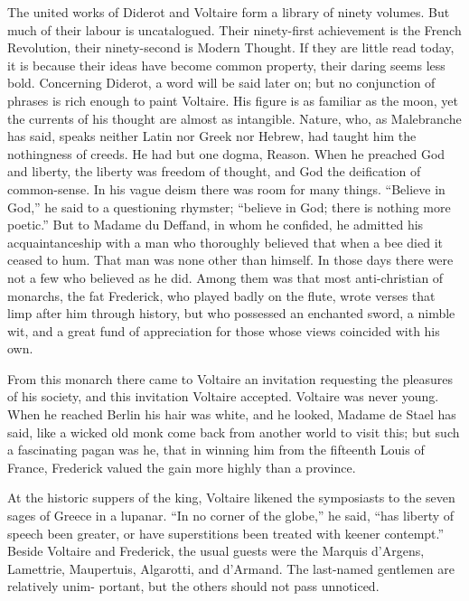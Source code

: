 \documentclass[]{book}
\begin{document}
The united works of Diderot and Voltaire form a library of ninety
volumes. But much of their labour is uncatalogued. Their ninety-first
achievement is the French Revolution, their ninety-second is Modern
Thought. If they are little read today, it is because their ideas have
become common property, their daring seems less bold. Concerning
Diderot, a word will be said later on; but no conjunction of phrases is
rich enough to paint Voltaire. His figure is as familiar as the moon,
yet the currents of his thought are almost as intangible. Nature, who,
as Malebranche has said, speaks neither Latin nor Greek nor Hebrew, had
taught him the nothingness of creeds. He had but one dogma, Reason. When
he preached God and liberty, the liberty was freedom of thought, and God
the deification of common-sense. In his vague deism there was room for
many things. ``Believe in God,'' he said to a questioning rhymster;
``believe in God; there is nothing more poetic.'' But to Madame du
Deffand, in whom he confided, he admitted his acquaintanceship with a
man who thoroughly believed that when a bee died it ceased to hum. That
man was none other than himself. In those days there were not a few who
believed as he did. Among them was that most anti-christian of monarchs,
the fat Frederick, who played badly on the flute, wrote verses that limp
after him through history, but who possessed an enchanted sword, a
nimble wit, and a great fund of appreciation for those whose views
coincided with his own.

From this monarch there came to Voltaire an invitation requesting the
pleasures of his society, and this invitation Voltaire accepted.
Voltaire was never young. When he reached Berlin his hair was white, and
he looked, Madame de Stael has said, like a wicked old monk come back
from another world to visit this; but such a fascinating pagan was he,
that in winning him from the fifteenth Louis of France, Frederick valued
the gain more highly than a province.

At the historic suppers of the king, Voltaire likened the symposiasts to
the seven sages of Greece in a lupanar. ``In no corner of the globe,''
he said, ``has liberty of speech been greater, or have superstitions
been treated with keener contempt.'' Beside Voltaire and Frederick, the
usual guests were the Marquis d'Argens, Lamettrie, Maupertuis,
Algarotti, and d'Armand. The last-named gentlemen are relatively unim-
portant, but the others should not pass unnoticed.
\end{document}
